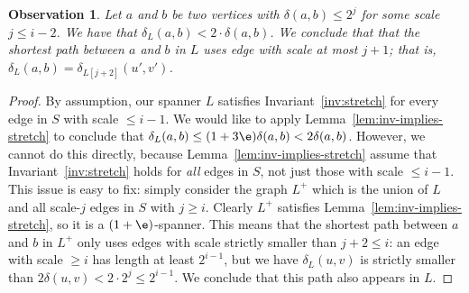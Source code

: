\documentclass[11pt]{article}
\newtheorem{observation}[theorem]{Observation}
\newcommand{\dist}{\ensuremath{\delta}}
\begin{document}
\begin{observation}
\label{obs:small-L}
    Let $a$ and $b$ be two vertices with $\dist(a,b) \le 2^j$ for some scale $j \le i - 2$. 
    We have that $\dist_L(a,b) < 2 \cdot \dist(a,b)$. We conclude that that the shortest path between $a$ and $b$ in $L$ uses edge with scale at most $j+1$; that is, $\dist_{L}(a,b) = \dist_{L[j+2]}(u',v')$.
\end{observation}
\begin{proof}
    By assumption, our spanner $L$ satisfies Invariant~\ref{inv:stretch} for every edge in $S$ with scale $\le i - 1$. We would like to apply Lemma~\ref{lem:inv-implies-stretch} to conclude that $\dist_L(a,b) \le (1+3\e) \dist(a,b) < 2 \dist(a,b)$. However, we cannot do this directly, because Lemma~\ref{lem:inv-implies-stretch} assume that Invariant~\ref{inv:stretch} holds for \emph{all} edges in $S$, not just those with scale $\le i -1$. This issue is easy to fix: simply consider the graph $L^+$ which is the union of $L$ and all scale-$j$ edges in $S$ with $j \ge i$. Clearly $L^+$ satisfies Lemma~\ref{lem:inv-implies-stretch}, so it is a $(1+\e)$-spanner. This means that the shortest path between $a$ and $b$ in $L^+$ only uses edges with scale strictly smaller than $j + 2 \le i$: an edge with scale $\ge i$ has length at least $2^{i-1}$, but we have $\dist_L(u,v)$ is strictly smaller than $2 \dist(u,v) < 2 \cdot 2^{j} \le 2^{i-1}$. We conclude that this path also appears in $L$.
\end{proof}
\end{document}
